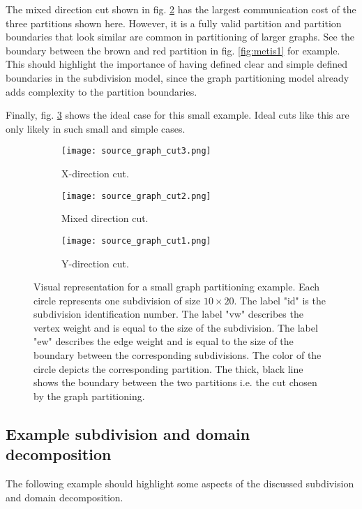 The mixed direction cut shown in fig. \ref{fig:cut2} has the largest communication cost of the three partitions shown here.
However, it is a fully valid partition and partition boundaries that look similar are common in partitioning of larger graphs.
See the boundary between the brown and red partition in fig. \ref{fig:metis1} for example.
This should highlight the importance of having defined clear and simple defined boundaries in the subdivision model, since the graph partitioning model already adds complexity to the partition boundaries.

Finally, fig. \ref{fig:cut3} shows the ideal case for this small example.
Ideal cuts like this are only likely in such small and simple cases.

\begin{figure}[!htbp]
\begin{subfigure}{0.34\textwidth}
  \texttt{[image: source\_graph\_cut3.png]}
  \caption{X-direction cut.}
  \label{fig:cut1}
\end{subfigure}%
\begin{subfigure}{0.34\textwidth}
  \texttt{[image: source\_graph\_cut2.png]}
  \caption{Mixed direction cut.}
  \label{fig:cut2}
\end{subfigure}%
\begin{subfigure}{0.34\textwidth}
  \texttt{[image: source\_graph\_cut1.png]}
  \caption{Y-direction cut.}
  \label{fig:cut3}
\end{subfigure}\hfill
\caption{Visual representation for a small graph partitioning example.
Each circle represents one subdivision of size $10 \times 20$.
The label "id" is the subdivision identification number.
The label "vw" describes the vertex weight and is equal to the size of the subdivision.
The label "ew" describes the edge weight and is equal to the size of the boundary between the corresponding subdivisions.
The color of the circle depicts the corresponding partition.
The thick, black line shows the boundary between the two partitions i.e. the cut chosen by the graph partitioning.}
\label{fig:sourcegraph}
\end{figure}

\subsection{Example subdivision and domain decomposition}
The following example should highlight some aspects of the discussed subdivision and domain decomposition.

